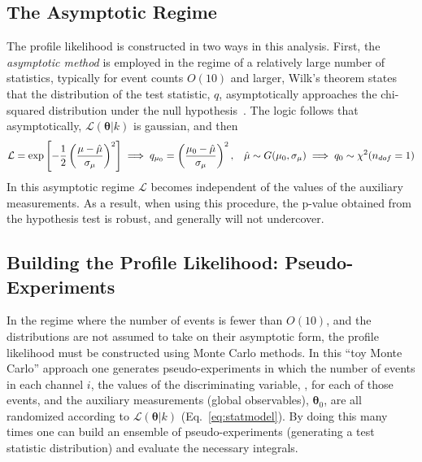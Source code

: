 \subsection{The Asymptotic Regime}
The profile likelihood is constructed in two ways in this analysis.
First, the \emph{asymptotic method} is employed in the regime of a relatively large number of statistics, typically for event counts $O(10)$ and larger, Wilk's theorem states that the distribution of the test statistic, $q$, asymptotically approaches the chi-squared distribution under the null hypothesis~\cite{Wilks:1938dza}. 
The logic follows that asymptotically, $\mathcal{L}(\boldsymbol\theta|k)$ is gaussian, and then
\begin{equation*}
  \mathcal{L} = \exp{\left[-\frac{1}{2}\left(\frac{\mu-\hat{\mu}}{\sigma_{\mu}}\right)^{2}\right]} \implies q_{\mu_{0}} = \left(\frac{\mu_{0}-\hat{\mu}}{\sigma_{\mu}}\right)^2, \hspace{0.3cm} \hat{\mu}\sim G(\mu_{0}, \sigma_{\mu}) \implies q_{0}\sim\chi^{2}(n_{dof}=1)
  \label{eq:asymptotic}
\end{equation*}
In this asymptotic regime $\mathcal{L}$ becomes independent of the values of the auxiliary measurements. As a result, when using this procedure, the p-value obtained from the hypothesis test is robust, and generally will not undercover.

\subsection{Building the Profile Likelihood: Pseudo-Experiments}
In the regime where the number of events is fewer than $O(10)$, and the distributions are not assumed to take on their asymptotic form, the profile likelihood must be constructed using Monte Carlo methods.
In this “toy Monte Carlo” approach one generates pseudo-experiments in which the number of events in each channel $i$, the values of the discriminating variable, \mZl, for each of those events, and the auxiliary measurements (global observables), $\boldsymbol\theta_{0}$, are all randomized according to $\mathcal{L}(\boldsymbol\theta|k)$ (Eq.~\ref{eq:statmodel}).
By doing this many times one can build an ensemble of pseudo-experiments (generating a test statistic distribution) and evaluate the necessary integrals.

